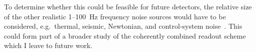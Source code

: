 To determine whether this could be feasible for future detectors, the relative size of the other realistic 1--100~Hz frequency noise sources would have to be considered, e.g.\ thermal, seismic, Newtonian, and control-system noise~\cite{buikemaSensitivityPerformanceAdvanced2020}.
This could form part of a broader study of the coherently combined readout scheme which I leave to future work.


